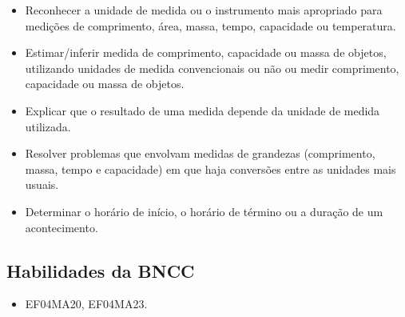 \begin{itemize}
\item Reconhecer a unidade de medida ou o instrumento mais apropriado para
medições de comprimento, área, massa, tempo, capacidade ou temperatura.

\item Estimar/inferir medida de comprimento, capacidade ou massa de objetos,
utilizando unidades de medida convencionais ou não ou medir comprimento,
capacidade ou massa de objetos.

\item Explicar que o resultado de uma medida depende da unidade de medida
utilizada.

\item Resolver problemas que envolvam medidas de grandezas (comprimento,
massa, tempo e capacidade) em que haja conversões entre as unidades mais
usuais.

\item Determinar o horário de início, o horário de término ou a duração de
um acontecimento.
\end{itemize}

\subsection{Habilidades da BNCC}

\begin{itemize}
\item EF04MA20, EF04MA23.
\end{itemize}


